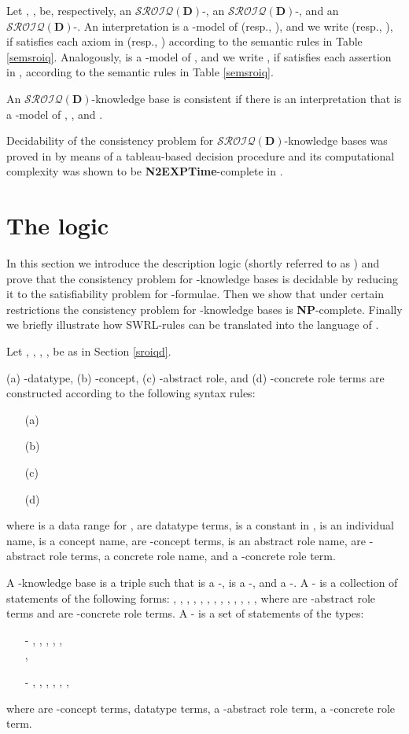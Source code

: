 \documentclass[a4paper]{llncs}
\newcommand{\sroiqd}{\ensuremath{\mathcal{SROIQ}(\D)}}
\newcommand{\D}{\mathbf{D}}
\begin{document}
Let , ,  be, respectively, an \sroiqd-, an \sroiqd-, and  an \sroiqd-. An interpretation  is a -model of  (resp., ), and we write  (resp., ), if  satisfies each axiom in  (resp., ) according to the semantic rules in Table \ref{semsroiq}.  Analogously,   is a -model of , and we write , if  satisfies each assertion in , according to the semantic rules in Table \ref{semsroiq}.

An \sroiqd-knowledge base  is consistent if there is an interpretation  that is a -model of ,  , and .

Decidability of the consistency problem for \sroiqd-knowledge bases was proved in \cite{Horrocks2006} by means of a tableau-based decision procedure and its computational complexity was shown to be \textbf{N2EXPTime}-complete in \cite{Kazakov:08:RIQ:SROIQ}.



\section{The logic }\label{dlss}
In this section we introduce the description logic  (shortly referred to as ) and prove that the consistency problem for -knowledge bases is decidable by reducing it to the satisfiability problem for -formulae. Then we show that under certain restrictions the consistency problem for -knowledge bases is \textbf{NP}-complete. Finally we briefly illustrate how SWRL-rules can be translated into the language of .

Let , , , ,  be as in Section \ref{sroiqd}.


\noindent
(a) -datatype, (b) -concept, (c) -abstract role, and (d) -concrete role terms are constructed according to the following syntax rules:
\begin{itemize}
\item[(a)] 

\item[(b)] 

\item[(c)] 

\item[(d)] 
\end{itemize}
where  is a data range for ,  are datatype terms,  is a constant in ,  is an individual name,  is a concept name,  are -concept terms,  is an abstract role name,  are -abstract role terms,  a concrete role name, and  a -concrete role term.

A -knowledge base is a triple  such that  is a -,  is a -, and  a -. A - is a collection of statements of the following forms: , , , , , , , ,
, , , , , where  are -abstract role terms and  are -concrete role terms. A - is a set of statements of the types:
\begin{itemize}
\item[-] , , , , , \\,
\item[-] , , , , , ,
\end{itemize}
where  are -concept terms,  datatype terms,   a -abstract role term,  a -concrete role term.
\end{document}
